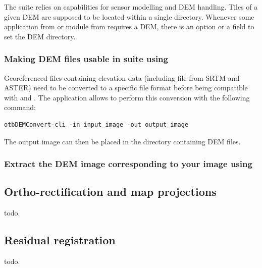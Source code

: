 The \otb suite relies on \ossim capabilities for sensor modelling and
DEM handling. Tiles of a given DEM are supposed to be located within a
single directory. Whenever some application from \app or module from
\mont requires a DEM, there is an option or a field to set the DEM
directory.

\subsubsection{Making DEM files usable in \otb suite using \app}

Georeferenced files containing elevation data (including file from
SRTM and ASTER) need to be converted to a specific file format before
being compatible with \ossim and \otb. The
 application allows to perform this
conversion with the following command:

\begin{verbatim}
otbDEMConvert-cli -in input_image -out output_image
\end{verbatim}

The output image can then be placed in the directory containing DEM
files.

\subsubsection{Extract the DEM image corresponding to your image using
  \mont}


\subsection{Ortho-rectification and map projections}\label{ssec:ortho}

todo.

\subsection{Residual registration}\label{ssec:registration}

todo.
